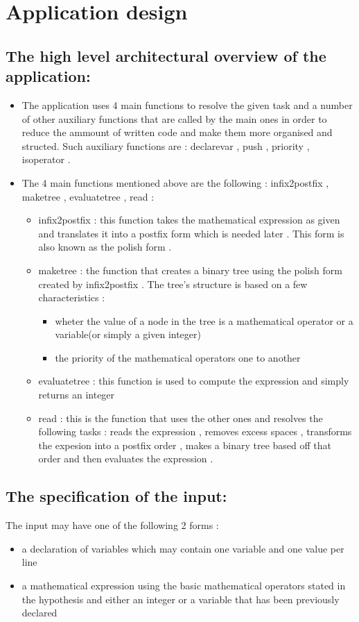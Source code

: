 \documentclass{article}
\begin{document}
\section{Application design}
\subsection {The high level architectural overview of the application:}
\begin{itemize}
\item The application uses 4 main functions to resolve the given task and a number of other auxiliary functions that are called by the main ones in order to reduce the ammount of written code and make them more organised and structed. Such auxiliary functions are :  declarevar , push , priority , isoperator . 
\item The 4 main functions mentioned above are the following : infix2postfix , maketree , evaluatetree , read :
	  \begin{itemize}
		 \item infix2postfix : this function takes the mathematical expression as given and translates it into a postfix form which is needed later . This form is also known as the polish form .
		 \item maketree : the function that creates a binary tree using the polish form created by infix2postfix . The tree's structure is based on a few characteristics :
									 \begin{itemize}
									   \item wheter the value of a node in the tree is a mathematical operator or a variable(or simply a given integer)
									   \item the priority of the mathematical operators one to another
									 \end{itemize}
		\item evaluatetree : this function is used to compute the expression and simply returns an integer 
		\item read : this is the function that uses the other ones and resolves the following tasks : reads the expression , removes excess spaces , transforms the expesion into a postfix order , makes a binary tree based off that order and then evaluates the expression .
	\end{itemize}
\end{itemize}

\subsection {The specification of the input:}
The input may have one of the following 2 forms :
	\begin{itemize}
		\item a declaration of variables which may contain one variable and one value per line
		\item a mathematical expression using the basic mathematical operators stated in the hypothesis and either an integer or a variable that has been previously declared
	\end{itemize}
	
\end{document}
